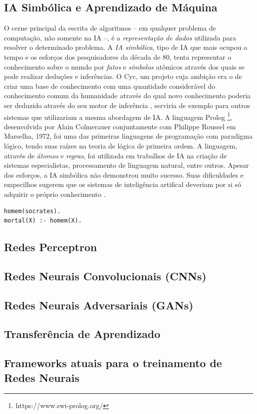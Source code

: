 \documentclass[12pt, a4paper]{article}
\begin{document}
\subsection{IA Simbólica e Aprendizado de Máquina}
O cerne principal da escrita de algoritmos -- em qualquer problema de computação, não somente na IA --, 
é a \emph{representação de dados} utilizada para resolver o determinado problema. A \emph{IA simbólica},
tipo de IA que mais ocupou o tempo e os esforços dos pesquisadores da década de 80, tenta representar o conhecimento
sobre o mundo por \emph{fatos} e \emph{símbolos} atômicos através dos quais se pode realizar deduções e inferências. 
O Cyc, um projeto cuja ambição era o de criar uma
base de conhecimento com uma quantidade considerável do conhecimento comum da humanidade através do qual
novo conhecimento poderia ser deduzido através do seu motor de inferência \cite{cyc}, serviria de exemplo para outros sistemas
que utilizariam a mesma abordagem de IA. A linguagem Prolog \footnote{https://www.swi-prolog.org/}, 
desenvolvida por Alain Colmerauer conjuntamente com Philippe Roussel em Marselha, 1972, 
foi uma das primeiras linguagens de programação com paradigma lógico, tendo suas raízes na teoria de lógica de primeira ordem.
A linguagem, através de \emph{átomos} e \emph{regras}, foi utilizada em trabalhos de IA na criação de sistemas especialistas,
processamento de linguagem natural, entre outros. 
Apesar dos esforços, a IA simbólica não demonstrou muito sucesso. Suas dificuldades e empecilhos sugerem que os sistemas de inteligência
artifical deveriam por si só adquirir o próprio conhecimento \cite{Goodfellow-et-al-2016}.

\begin{lstlisting}[caption={Exemplo do uso da linguagem Prolog para modelar a famosa proposição da mortalidade de Sócrates}, captionpos=b]
homem(socrates).
mortal(X) :- homem(X).
\end{lstlisting}

\subsection{Redes Perceptron}
\subsection{Redes Neurais Convolucionais (CNNs)}
\subsection{Redes Neurais Adversariais (GANs)}
\subsection{Transferência de Aprendizado}
\subsection{Frameworks atuais para o treinamento de Redes Neurais}

\printbibliography
\end{document}
